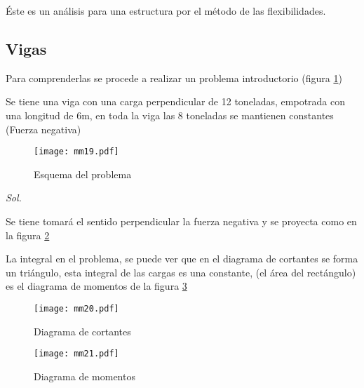 Éste es un análisis para una estructura por el método de las flexibilidades. 
\subsection{Vigas}

Para comprenderlas se procede a realizar un problema introductorio (figura \ref{mm19})
\begin{example}
    Se tiene una viga con una carga perpendicular de 12 toneladas, empotrada con una longitud de 6m, en toda la viga las 8 toneladas se mantienen constantes (Fuerza negativa)
\end{example}
\begin{figure}[h!]
\centering
  \texttt{[image: mm19.pdf]}
  \caption{Esquema del problema}
  \label{mm19}
\end{figure}
\textit{ Sol. }

Se tiene tomará el sentido perpendicular la fuerza negativa y se proyecta como en la figura \ref{mm20}

La integral en el problema, se puede ver que en el diagrama de cortantes se forma un triángulo, esta integral de las cargas es una constante,
(el área del rectángulo) es el diagrama de momentos de la figura \ref{mm21}
\begin{figure}[h!]
\centering
  \texttt{[image: mm20.pdf]}
  \caption{Diagrama de cortantes}
  \label{mm20}
\end{figure}

\begin{figure}[h!]
\centering
  \texttt{[image: mm21.pdf]}
  \caption{Diagrama de momentos}
  \label{mm21}
\end{figure}

